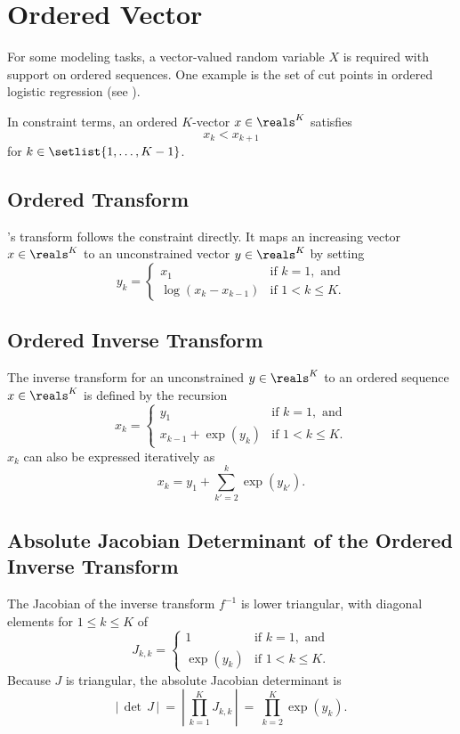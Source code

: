\section{Ordered Vector}

For some modeling tasks, a vector-valued random variable $X$ is
required with support on ordered sequences.  One example is the set of
cut points in ordered logistic regression (see ).

In constraint terms, an ordered $K$-vector $x \in \reals^K$ satisfies
\[
x_k < x_{k+1}
\]
%
for $k \in \setlist{1,\ldots,K-1}$.


\subsection{Ordered Transform}

\Stan's transform follows the constraint directly.  It maps an
increasing vector $x \in \reals^{K}$ to an unconstrained vector $y \in
\reals^K$ by setting
%
\[
y_k
=
\left\{
\begin{array}{ll}
x_1 & \mbox{if } k = 1, \mbox{ and}
\\[4pt]
\log \left( x_{k} - x_{k-1} \right) & \mbox{if } 1 < k \leq K.
\end{array}
\right.
\]

\subsection{Ordered Inverse Transform}

The inverse transform for an unconstrained $y \in \reals^K$ to an
ordered sequence $x \in \reals^K$ is defined by the recursion
%
\[
x_k
=
\left\{
\begin{array}{ll}
y_1 & \mbox{if } k = 1, \mbox{ and}
\\[4pt]
x_{k-1} + \exp(y_k) & \mbox{if } 1 < k \leq K.
\end{array}
\right.
\]
%
$x_k$ can also be expressed iteratively as
\[
x_k = y_1 + \sum_{k'=2}^k \exp(y_{k'}).
\]

\subsection{Absolute Jacobian Determinant of the Ordered
  Inverse Transform}

The Jacobian of the inverse transform $f^{-1}$ is lower triangular,
with diagonal elements for $1 \leq k \leq K$ of
\[
J_{k,k} =
\left\{
\begin{array}{ll}
1 & \mbox{if } k = 1, \mbox{ and}
\\[4pt]
\exp(y_k) & \mbox{if } 1 < k \leq K.
\end{array}
\right.
\]
%
Because $J$ is triangular, the absolute Jacobian determinant is
%
\[
\left| \, \det \, J \, \right|
\ = \
\left| \, \prod_{k=1}^K J_{k,k} \, \right|
\ = \
\prod_{k=2}^K \exp(y_k).
\]

